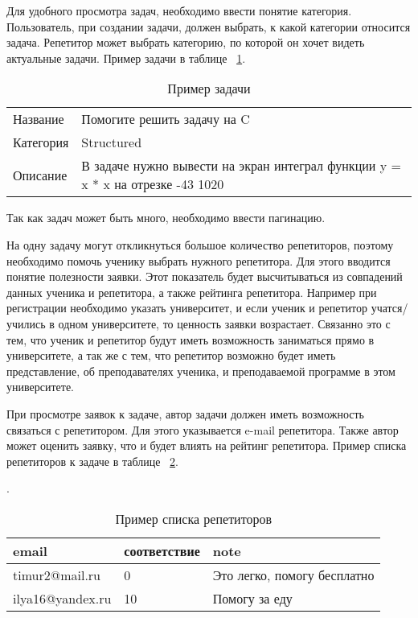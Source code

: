 Для удобного просмотра задач, необходимо ввести понятие категория. Пользователь, при создании задачи, должен выбрать, к какой категории относится задача.  Репетитор может выбрать категорию, по которой он хочет видеть актуальные задачи. Пример задачи в таблице ~\ref{table:example-task}. 

\begin{table}[h]
\caption{Пример задачи}\label{table:example-task}
\medskip
\begin{tabular}{|l|p{13cm}|}
\hline
Название & Помогите решить задачу на C  \\
Категория & Structured \\ 
Описание & В задаче нужно вывести на экран интеграл функции y = x * x на отрезке -43 1020 \\
\hline
\end{tabular}
\end{table}

Так как задач может быть много, необходимо ввести пагинацию.

На одну задачу могут откликнуться большое количество репетиторов, поэтому необходимо помочь ученику выбрать нужного репетитора. Для этого вводится понятие полезности заявки. Этот показатель будет высчитываться из совпадений данных ученика и репетитора, а также рейтинга репетитора. Например при регистрации необходимо указать университет, и если ученик и репетитор учатся/учились в одном университете, то ценность заявки возрастает. Связанно это с тем, что ученик и репетитор будут иметь возможность заниматься прямо в университете, а так же с тем, что репетитор возможно будет иметь представление, об преподавателях ученика, и преподаваемой программе в этом университете.

При просмотре заявок к задаче, автор задачи должен иметь возможность связаться с репетитором. Для этого указывается e-mail репетитора. Также автор может оценить заявку, что и будет влиять на рейтинг репетитора. Пример списка репетиторов к задаче в таблице ~\ref{table:example-list-rep}.

\begin{table}[h]
\caption{Пример списка репетиторов}\label{table:example-list-rep}.
\medskip
\begin{tabular}{|l|l|p{9cm}|}
\hline
email & соответствие & note\\
\hline
timur2@mail.ru & 0 & Это легко, помогу бесплатно\\
ilya16@yandex.ru & 10 & Помогу за еду\\
\hline
\end{tabular}
\end{table}

